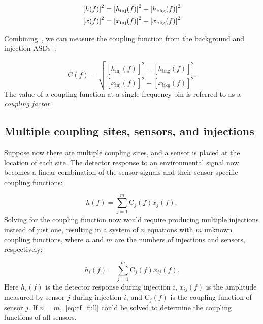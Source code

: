 \begin{align}
	\left[h(f)\right]^2 &= \left[h_{\textrm{inj}}(f)\right]^2 - \left[h_{\textrm{bkg}}(f)\right]^2 \label{eq:h_inj}\\
	\left[x(f)\right]^2 &= \left[x_{\textrm{inj}}(f)\right]^2 - \left[x_{\textrm{bkg}}(f)\right]^2 \label{eq:x_inj}
\end{align}

Combining~, we can measure the coupling function from the background and injection \acp{ASD}~\citep{Kruk_2016, pem_code}:

\begin{equation}\label{eq:cf}
	\mathrm{C}(f) = \sqrt{\frac{[h_{\textrm{inj}}(f)]^2 - [h_{\textrm{bkg}}(f)]^2}{[x_{\textrm{inj}}(f)]^2 - [x_{\textrm{bkg}}(f)]^2}}.
\end{equation}
The value of a coupling function at a single frequency bin is referred to as a \textit{coupling factor}.

\subsection{Multiple coupling sites, sensors, and injections}

Suppose now there are multiple coupling sites, and a sensor is placed at the location of each site.
The detector response to an environmental signal now becomes a linear combination of the sensor signals and their sensor-specific coupling functions:

\begin{equation}\label{eq:cf_model_expanded}
	h(f) = \sum_{j=1}^{m} \mathrm{C}_j(f) x_{j}(f),
\end{equation}
Solving for the coupling function now would require producing multiple injections instead of just one, resulting in a system of $n$ equations with $m$ unknown coupling functions, where $n$ and $m$ are the numbers of injections and sensors, respectively:

\begin{equation}\label{eq:cf_full}
	h_i(f) = \sum_{j=1}^{m} \mathrm{C}_j(f) x_{ij}(f).
\end{equation}
Here $h_i(f)$ is the detector response during injection $i$, $x_{ij}(f)$ is the amplitude measured by sensor $j$ during injection $i$, and $\mathrm{C}_j(f)$ is the coupling function of sensor $j$.
If $n = m$,~\cref{eq:cf_full} could be solved to determine the coupling functions of all sensors.


